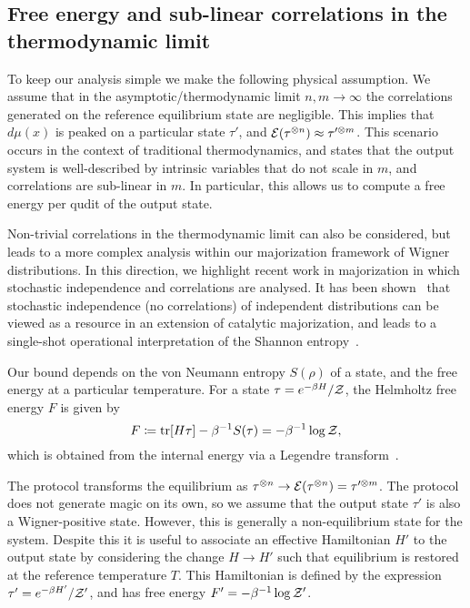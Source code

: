 \documentclass[
onecolumn,
superscriptaddress
]{revtex4-1}
\renewcommand{\tr}{{\rm{tr}}}
\def\Z{{\cal Z}}
\def\E{{\cal E}}
\begin{document}
\subsection*{Free energy and sub-linear correlations in the thermodynamic limit}

To keep our analysis simple we make the following physical assumption. We assume that in the asymptotic/thermodynamic limit $n,m \rightarrow \infty$ the correlations generated on the reference equilibrium state are negligible. This implies that $d\mu(x)$ is peaked on a particular state $\tau'$, and $\E(\tau^{\otimes n}) \approx \tau'^{\otimes m}$. This scenario occurs in the context of traditional thermodynamics, and states that the output system is well-described by intrinsic variables that do not scale in $m$, and correlations are sub-linear in $m$. In particular, this allows us to compute a free energy per qudit of the output state. 

Non-trivial correlations in the thermodynamic limit can also be considered, but leads to a more complex analysis within our majorization framework of Wigner distributions. In this direction, we highlight recent work in majorization in which stochastic independence and correlations are analysed. It has been shown~\cite{muller_2015} that stochastic independence (no correlations) of independent distributions can be viewed as a resource in an extension of catalytic majorization, and leads to a single-shot operational interpretation of the Shannon entropy~\cite{muller_2016, muller_2019}.

Our bound depends on the von Neumann entropy $S(\rho)$ of a state, and the free energy at a particular temperature.
For a state $\tau = e^{-\beta H}/\Z$, the Helmholtz free energy $F$ is given by
\begin{equation}
	F \coloneqq \tr[H \tau] - \beta^{-1}S(\tau) = -\beta^{-1}\log \Z,
\end{equation}
which is obtained from the internal energy via a Legendre transform~\cite{Pathria_1997}.

The protocol transforms the equilibrium as $\tau^{\otimes n} \rightarrow \E(\tau^{\otimes n}) = \tau^{\prime \otimes m}$.  The protocol does not generate magic on its own, so we assume that the output state $\tau'$ is also a Wigner-positive state. However, this is generally a non-equilibrium state for the system. Despite this it is useful to associate an effective Hamiltonian $H'$ to the output state by considering the change $H \rightarrow H'$ such that equilibrium is restored at the reference temperature $T$. This Hamiltonian is defined by the expression $\tau' = e^{-\beta H'}/\Z'$, and has free energy $F' = -\beta^{-1} \log \Z'$.
\end{document}

